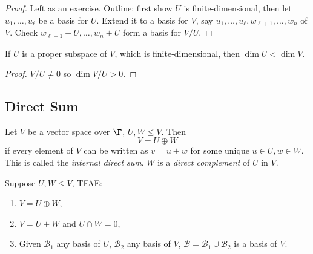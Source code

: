 \documentclass[a4paper]{article}
\newcommand*{\basis}{\mathcal}
\theoremstyle{definition}
\begin{document}
\begin{proof}
  Left as an exercise. Outline: first show \(U\) is finite-dimensional, then let \(u_1,\ldots,u_\ell\) be a basis for \(U\). Extend it to a basis for \(V\), say \(u_1,\ldots,u_\ell,w_{\ell+1},\ldots,w_n\) of \(V\). Check \(w_{\ell+1}+U,\ldots,w_n+U\) form a basis for \(V/U\).
\end{proof}

\begin{corollary}
  If \(U\) is a proper subspace of \(V\), which is finite-dimensional, then \(\dim U < \dim V\).
\end{corollary}

\begin{proof}
  \(V/U \neq 0\) so \(\dim V/U > 0\).
\end{proof}

\subsection{Direct Sum}

\begin{definition}
  Let \(V\) be a vector space over \(\F\), \(U, W\leq V\). Then
  \[
    V = U \oplus W
  \]
  if every element of \(V\) can be written as \(v=u+w\) for some unique \(u\in U, w\in W\). This is called the \emph{internal direct sum}. \(W\) is a \emph{direct complement} of \(U\) in \(V\).
\end{definition}

\begin{lemma}
  Suppose \(U,W\leq V\), TFAE:
  \begin{enumerate}
  \item \(V = U \oplus W\),
  \item \(V=U+W\) and \(U\cap W = 0\),
  \item Given \(\basis B_1\) any basis of \(U\), \(\basis B_2\) any basis of \(V\), \(\basis B = \basis B_1\cup \basis B_2\) is a basis of \(V\).
  \end{enumerate}
\end{lemma}
\end{document}
